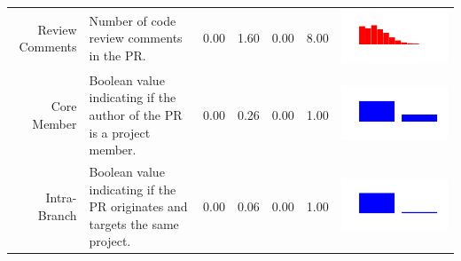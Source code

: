 \documentclass[conference]{IEEEtran}
\begin{document}
\begin{table}[ht]
\begin{tabular}{rp{26em}rrrrc}
    Review Comments & Number of code review comments in the PR. & 0.00 & 1.60 & 0.00 & 8.00 & \includegraphics[scale = 0.1, clip = true, trim= 50px 60px 50px 60px]{../figs/hist-features/hist-reviewComments.pdf} \\
    Core Member & Boolean value indicating if the author of the PR is a project member. & 0.00 & 0.26 & 0.00 & 1.00 & \includegraphics[scale = 0.1, clip = true, trim= 50px 60px 50px 60px]{../figs/hist-features/hist-coreMember.pdf} \\
    Intra-Branch & Boolean value indicating if the PR originates and targets the same project. & 0.00 & 0.06 & 0.00 & 1.00 & \includegraphics[scale = 0.1, clip = true, trim= 50px 60px 50px 60px]{../figs/hist-features/hist-intraBranch.pdf} \\

\end{tabular}
\end{table}
\end{document}
